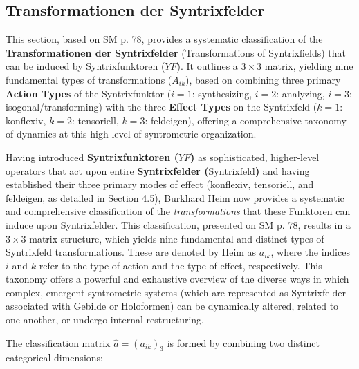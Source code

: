 \documentclass[12pt]{article}
\newcommand{\syntrixfeld}{\text{Syntrixfeld}}
\newcommand{\syntrixfunktor}{YF}
\begin{document}
\subsection{Transformationen der Syntrixfelder}
\label{sec:syntrixfeld_transformationen}

This section, based on SM p. 78, provides a systematic classification of the \textbf{Transformationen der Syntrixfelder} (Transformations of Syntrixfields) that can be induced by Syntrixfunktoren (\(\syntrixfunktor\)). It outlines a \(3 \times 3\) matrix, yielding nine fundamental types of transformations (\(A_{ik}\)), based on combining three primary \textbf{Action Types} of the Syntrixfunktor (\(i=1\): synthesizing, \(i=2\): analyzing, \(i=3\): isogonal/transforming) with the three \textbf{Effect Types} on the Syntrixfeld (\(k=1\): konflexiv, \(k=2\): tensoriell, \(k=3\): feldeigen), offering a comprehensive taxonomy of dynamics at this high level of syntrometric organization.

Having introduced \textbf{Syntrixfunktoren (\( \syntrixfunktor \))} as sophisticated, higher-level operators that act upon entire \textbf{Syntrixfelder (\(\syntrixfeld\))} and having established their three primary modes of effect (konflexiv, tensoriell, and feldeigen, as detailed in Section 4.5), Burkhard Heim now provides a systematic and comprehensive classification of the \textit{transformations} that these Funktoren can induce upon Syntrixfelder. This classification, presented on SM p. 78, results in a \( 3 \times 3 \) matrix structure, which yields nine fundamental and distinct types of Syntrixfeld transformations. These are denoted by Heim as \( a_{ik} \), where the indices \(i\) and \(k\) refer to the type of action and the type of effect, respectively. This taxonomy offers a powerful and exhaustive overview of the diverse ways in which complex, emergent syntrometric systems (which are represented as Syntrixfelder associated with Gebilde or Holoformen) can be dynamically altered, related to one another, or undergo internal restructuring.

The classification matrix \( \hat{a} = (a_{ik})_3 \) is formed by combining two distinct categorical dimensions:
\end{document}
